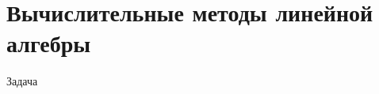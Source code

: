 \documentclass{article}
\begin{document}
\section{Вычислительные методы линейной алгебры}
Задача
\end{document}
